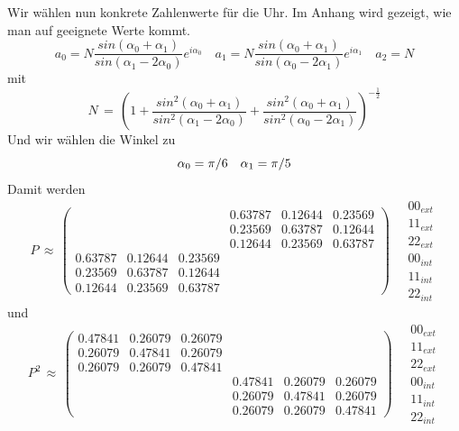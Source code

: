 \documentclass[12pt]{article}
\begin{document}
Wir wählen nun konkrete Zahlenwerte für die Uhr. Im Anhang wird gezeigt, wie man auf geeignete Werte kommt.
\begin{equation*}
a_0=N\frac{sin(\alpha_0+\alpha_1)}{sin(\alpha_1-2\alpha_0)}e^{i\alpha_0} \quad
a_1=N\frac{sin(\alpha_0+\alpha_1)}{sin(\alpha_0-2\alpha_1)}e^{i\alpha_1} \quad
a_2=N
\end{equation*}
mit 
\begin{equation*}
N\, = \, \left( 1 +
\frac{sin^2(\alpha_0+\alpha_1)}{sin^2(\alpha_1-2\alpha_0)} +
\frac{sin^2(\alpha_0+\alpha_1)}{sin^2(\alpha_0-2\alpha_1)} \right)^{-\frac{1}{2}}
\end{equation*}
Und wir wählen die Winkel zu
\begin{equation*}
\alpha_0 = \pi / 6 \quad \alpha_1 = \pi / 5 \\ \\
\end{equation*}
Damit werden 
\begin{equation*}
P\, \approx\,
\begin{pmatrix}
   &&& 0.63787 &  0.12644 &  0.23569 \\
   &&& 0.23569 &  0.63787 &  0.12644 \\
   &&& 0.12644 &  0.23569 &  0.63787 \\
   0.63787 &  0.12644 &  0.23569 &&& \\
   0.23569 &  0.63787 &  0.12644 &&& \\
   0.12644 &  0.23569 &  0.63787 &&& 
\end{pmatrix}
\quad
\begin{matrix}
00_{ext} \\ 11_{ext} \\ 22_{ext} \\ 00_{int} \\ 11_{int} \\ 22_{int}
\end{matrix}
\end{equation*}
und
\begin{equation*}
P^2\, \approx\,
\begin{pmatrix}
   0.47841 & 0.26079 & 0.26079 &&& \\
   0.26079 & 0.47841 & 0.26079 &&& \\
   0.26079 & 0.26079 & 0.47841 &&& \\
   &&& 0.47841 & 0.26079 & 0.26079 \\
   &&& 0.26079 & 0.47841 & 0.26079 \\
   &&& 0.26079 & 0.26079 & 0.47841
\end{pmatrix}
\quad
\begin{matrix}
00_{ext} \\ 11_{ext} \\ 22_{ext} \\ 00_{int} \\ 11_{int} \\ 22_{int}
\end{matrix}
\end{equation*}
\end{document}

